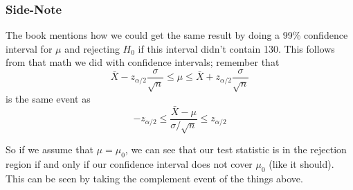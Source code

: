 \documentclass{beamer}
\begin{document}
\begin{frame}
\frametitle{Side-Note}

The book mentions how we could get the same result by doing a 99\% confidence interval for $\mu$ and rejecting $H_0$ if this interval didn't contain 130. This follows from that math we did with confidence intervals; remember that
\[
\bar{X} - z_{\alpha/2}\frac{\sigma}{\sqrt{n}} \le \mu \le \bar{X} + z_{\alpha/2}\frac{\sigma}{\sqrt{n}}
\]
is the same event as 
\[
-z_{\alpha/2} \le \frac{\bar{X} - \mu}{\sigma / \sqrt{n}} \le z_{\alpha/2}
\]

So if we assume that $\mu = \mu_0$, we can see that our test statistic is in the rejection region if and only if our confidence interval does not cover $\mu_0$ (like it should). This can be seen by taking the complement event of the things above.
\end{frame}
\end{document}
